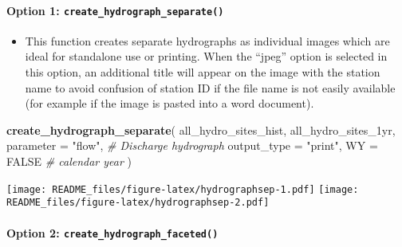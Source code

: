 \documentclass[
]{article}
\newenvironment{Shaded}{\begin{snugshade}}{\end{snugshade}}
\newcommand{\AttributeTok}[1]{\textcolor[rgb]{0.13,0.29,0.53}{#1}}
\newcommand{\CommentTok}[1]{\textcolor[rgb]{0.56,0.35,0.01}{\textit{#1}}}
\newcommand{\ConstantTok}[1]{\textcolor[rgb]{0.56,0.35,0.01}{#1}}
\newcommand{\FunctionTok}[1]{\textcolor[rgb]{0.13,0.29,0.53}{\textbf{#1}}}
\newcommand{\NormalTok}[1]{#1}
\newcommand{\StringTok}[1]{\textcolor[rgb]{0.31,0.60,0.02}{#1}}
\providecommand{\tightlist}{%
  \setlength{\itemsep}{0pt}\setlength{\parskip}{0pt}}
\begin{document}
\hypertarget{option-1-create_hydrograph_separate}{%
\paragraph{\texorpdfstring{\textbf{Option 1}:
\texttt{create\_hydrograph\_separate()}}{Option 1: create\_hydrograph\_separate()}}\label{option-1-create_hydrograph_separate}}

\begin{itemize}
\tightlist
\item
  This function creates separate hydrographs as individual images which
  are ideal for standalone use or printing. When the ``jpeg'' option is
  selected in this option, an additional title will appear on the image
  with the station name to avoid confusion of station ID if the file
  name is not easily available (for example if the image is pasted into
  a word document).
\end{itemize}

\begin{Shaded}
\begin{Highlighting}[]

\FunctionTok{create\_hydrograph\_separate}\NormalTok{(}
\NormalTok{  all\_hydro\_sites\_hist,}
\NormalTok{  all\_hydro\_sites\_1yr,}
  \AttributeTok{parameter =} \StringTok{"flow"}\NormalTok{, }\CommentTok{\# Discharge hydrograph}
  \AttributeTok{output\_type =} \StringTok{"print"}\NormalTok{,}
  \AttributeTok{WY =} \ConstantTok{FALSE} \CommentTok{\# calendar year}
\NormalTok{)}
\end{Highlighting}
\end{Shaded}

\texttt{[image: README\_files/figure-latex/hydrographsep-1.pdf]}
\texttt{[image: README\_files/figure-latex/hydrographsep-2.pdf]}

\hypertarget{option-2-create_hydrograph_faceted}{%
\paragraph{\texorpdfstring{\textbf{Option 2}:
\texttt{create\_hydrograph\_faceted()}}{Option 2: create\_hydrograph\_faceted()}}\label{option-2-create_hydrograph_faceted}}
\end{document}
